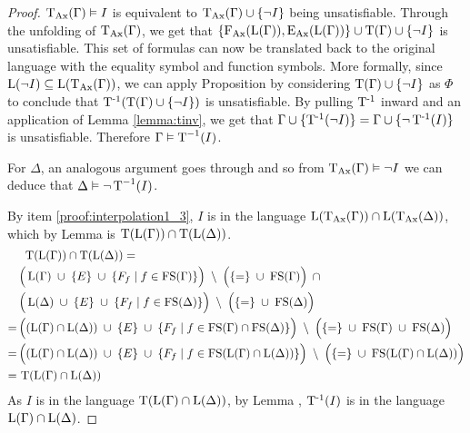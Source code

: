 \begin{proof}
			$\operatorname{\operatorname{T}_{Ax}}(\Gamma) \vDash I$ is equivalent to $\operatorname{\operatorname{T}_{Ax}}(\Gamma) \cup \{\lnot I\}$ being unsatisfiable.
			Through the unfolding of $\operatorname{\operatorname{T}_{Ax}}(\Gamma)$, we get that 
			$\{\operatorname{F_{Ax}}(\operatorname{L}(\Gamma)), \operatorname{E_{Ax}}(\operatorname{L}(\Gamma))\} \cup \operatorname{T}(\Gamma) \cup \{\lnot I\}$ is unsatisfiable.
			This set of formulas can now be translated back to the original language with the equality symbol and function symbols. 
			More formally, 
			since $\operatorname{L}(\lnot I) \subseteq \operatorname{L}(\operatorname{\operatorname{T}_{Ax}}(\Gamma))$, we can apply Proposition
			by considering $\operatorname{T}(\Gamma) \cup \{\lnot I\}$ as $\Phi$ to conclude that $\operatorname{T^{-1}}(\operatorname{T}(\Gamma) \cup \{\lnot I\})$ is unsatisfiable. By pulling $\operatorname{T^{-1}}$ inward and an application of Lemma \ref{lemma:tinv}, we get that $\Gamma \cup \{\operatorname{T^{-1}}(\lnot I)\} = \Gamma \cup \{\lnot \operatorname{T^{-1}}(I)\}$ is unsatisfiable. 
			Therefore $\Gamma \vDash \operatorname{T}^{-1}(I)$.

			For $\Delta$, an analogous argument goes through and so from $\operatorname{\operatorname{T}_{Ax}}(\Gamma) \vDash \lnot I$ we can deduce that $\Delta \vDash \lnot \operatorname{T}^{-1}(I)$.

			By item \ref{proof:interpolation1_3}, $I$ is in the language $\operatorname{L}(\operatorname{\operatorname{T}_{Ax}}(\Gamma)) \cap \operatorname{L}(\operatorname{\operatorname{T}_{Ax}}(\Delta))$, which by Lemma  is $\Trans(\Lang(\Gamma)) \cap\nolinebreak \Trans(\Lang(\Delta))$. 
				\newcommand{\somespace}{\;}
				\newcommand{\impconn}[1]{\somespace#1\somespace}
			\begin{align*}
				\noalign{$\Trans(\Lang(\Gamma))\cap\nolinebreak \Trans(\Lang(\Delta)) =$} 
				& \Big(\Lang(\Gamma)\impconn\cup \{E\}\impconn\cup\{F_f\mid f \in \FS(\Gamma)\}\Big) \impconn\setminus\Big(\{=\nolinebreak \} \impconn\cup \FS(\Gamma)\Big)\,\impconn\cap \\
				& \Big(\Lang(\Delta)\impconn\cup \{E\}\impconn\cup\{F_f\mid f \in \FS(\Delta)\}\Big) \impconn\setminus\Big(\{=\nolinebreak \} \impconn\cup \FS(\Delta)\Big)\\
				=\,& \Big((\Lang(\Gamma) \cap \Lang(\Delta)) \impconn\cup \{E\} \impconn\cup\{F_f\mid f \in \FS(\Gamma)\cap\FS(\Delta)\}\Big)  \impconn\setminus\Big(\{=\} \impconn\cup \FS(\Gamma) \impconn\cup \FS(\Delta)\Big) \\
				=\,& \Big((\Lang(\Gamma) \cap \Lang(\Delta)) \impconn\cup \{E\} \impconn\cup \{F_f\mid f\in \FS( \Lang(\Gamma) \cap \Lang(\Delta))\} \Big) \impconn\setminus \Big( \{=\} \impconn\cup \FS(\Lang(\Gamma) \cap \Lang(\Delta)) \Big)  \\ 
				=\,& \Trans(\Lang(\Gamma) \cap \Lang(\Delta))
			\end{align*}
			As $I$ is in the language $\operatorname{T}(\operatorname{L}(\Gamma) \cap \operatorname{L}(\Delta))$, by Lemma , $\operatorname{T^{-1}}(I)$ is in the language $\operatorname{L}(\Gamma) \cap \operatorname{L}(\Delta)$.
		\end{proof}


